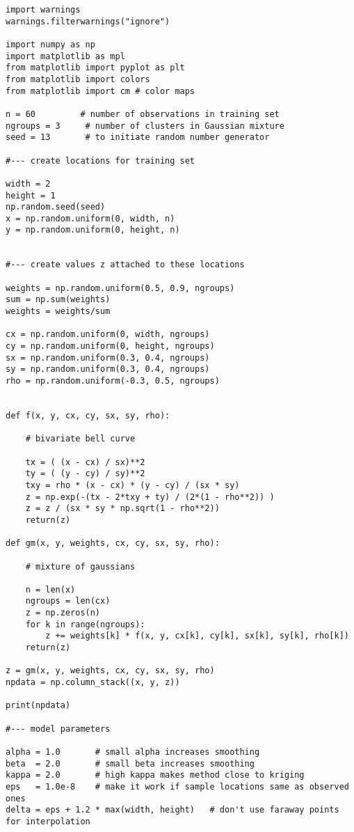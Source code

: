\documentclass[oneside,10pt]{book}
\begin{document}
\begin{lstlisting}
import warnings
warnings.filterwarnings("ignore")

import numpy as np
import matplotlib as mpl
from matplotlib import pyplot as plt
from matplotlib import colors  
from matplotlib import cm # color maps

n = 60         # number of observations in training set
ngroups = 3     # number of clusters in Gaussian mixture
seed = 13       # to initiate random number generator

#--- create locations for training set

width = 2
height = 1
np.random.seed(seed)
x = np.random.uniform(0, width, n)
y = np.random.uniform(0, height, n)


#--- create values z attached to these locations

weights = np.random.uniform(0.5, 0.9, ngroups)
sum = np.sum(weights)
weights = weights/sum

cx = np.random.uniform(0, width, ngroups)
cy = np.random.uniform(0, height, ngroups)
sx = np.random.uniform(0.3, 0.4, ngroups)
sy = np.random.uniform(0.3, 0.4, ngroups)
rho = np.random.uniform(-0.3, 0.5, ngroups)


def f(x, y, cx, cy, sx, sy, rho):

    # bivariate bell curve

    tx = ( (x - cx) / sx)**2
    ty = ( (y - cy) / sy)**2
    txy = rho * (x - cx) * (y - cy) / (sx * sy)
    z = np.exp(-(tx - 2*txy + ty) / (2*(1 - rho**2)) )
    z = z / (sx * sy * np.sqrt(1 - rho**2))
    return(z)

def gm(x, y, weights, cx, cy, sx, sy, rho):

    # mixture of gaussians

    n = len(x)
    ngroups = len(cx)
    z = np.zeros(n)   
    for k in range(ngroups):
        z += weights[k] * f(x, y, cx[k], cy[k], sx[k], sy[k], rho[k])
    return(z)

z = gm(x, y, weights, cx, cy, sx, sy, rho)
npdata = np.column_stack((x, y, z))

print(npdata)

#--- model parameters

alpha = 1.0       # small alpha increases smoothing
beta  = 2.0       # small beta increases smoothing
kappa = 2.0       # high kappa makes method close to kriging 
eps   = 1.0e-8    # make it work if sample locations same as observed ones
delta = eps + 1.2 * max(width, height)   # don't use faraway points for interpolation


\end{lstlisting}
\end{document}
